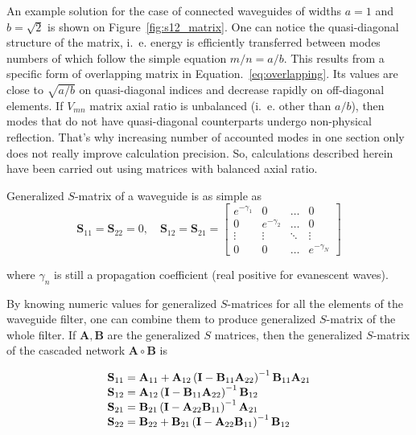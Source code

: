 \documentclass{pj}
\begin{document}
An example solution for the case of connected waveguides of widths
$a = 1$ and $b = \sqrt{2}$ is shown on
Figure~\ref{fig:s12_matrix}. One can notice the quasi-diagonal
structure of the matrix, i.~e. energy is efficiently transferred
between modes numbers of which follow the simple equation $m/n =
a/b$. This results from a specific form of overlapping matrix in
Equation.~\ref{eq:overlapping}. Its values are close to $\sqrt{a/b}$
on quasi-diagonal indices and decrease rapidly on off-diagonal
elements. If $V_{mn}$ matrix axial ratio is unbalanced (i.~e. other than
$a/b$), then modes that do not have quasi-diagonal counterparts
undergo non-physical reflection. That's why increasing number of
accounted modes in one section only does not really improve
calculation precision. So, calculations described herein have been
carried out using matrices with balanced axial ratio.

Generalized $S$-matrix of a waveguide is as simple as
\begin{equation}
  \label{eq:waveguide_element}
  \mathbf{S}_{11} = \mathbf{S}_{22} = 0, \quad
  \mathbf{S}_{12} = \mathbf{S}_{21} = 
  \begin{bmatrix}
    e^{-\gamma_1} & 0 & \dots & 0 \\
    0 & e^{-\gamma_2} & \dots & 0 \\
    \vdots & \vdots & \ddots & \vdots \\
    0 & 0 & \dots & e^{-\gamma_N}
  \end{bmatrix}
\end{equation}

where $\gamma_n$ is still a propagation coefficient (real positive for
evanescent waves).

By knowing numeric values for generalized $S$-matrices for all the
elements of the waveguide filter, one can combine them to produce
generalized $S$-matrix of the whole filter. If
$\mathbf{A}, \mathbf{B}$ are the generalized $S$ matrices, then the
generalized $S$-matrix of the cascaded network
$\mathbf{A} \circ \mathbf{B}$ is

\begin{equation}
  \begin{array}{r@{}l}
    \mathbf{S}_{11} &{}=  \mathbf{A}_{11} + \mathbf{A}_{12} \left(\mathbf{I} - \mathbf{B}_{11}\mathbf{A}_{22}\right)^{-1} \mathbf{B}_{11} \mathbf{A}_{21} \\
    \mathbf{S}_{12} &{}=  \mathbf{A}_{12} \left(\mathbf{I} - \mathbf{B}_{11}\mathbf{A}_{22}\right)^{-1} \mathbf{B}_{12} \\
    \mathbf{S}_{21} &{}=  \mathbf{B}_{21} \left(\mathbf{I} - \mathbf{A}_{22}\mathbf{B}_{11}\right)^{-1}\mathbf{A}_{21} \\
    \mathbf{S}_{22} &{}=  \mathbf{B}_{22} + \mathbf{B}_{21}\left(\mathbf{I} - \mathbf{A}_{22}\mathbf{B}_{11}\right)^{-1}\mathbf{B}_{12} \\
  \end{array}
  \label{eq:cascaded_s}  
\end{equation}
\end{document}
